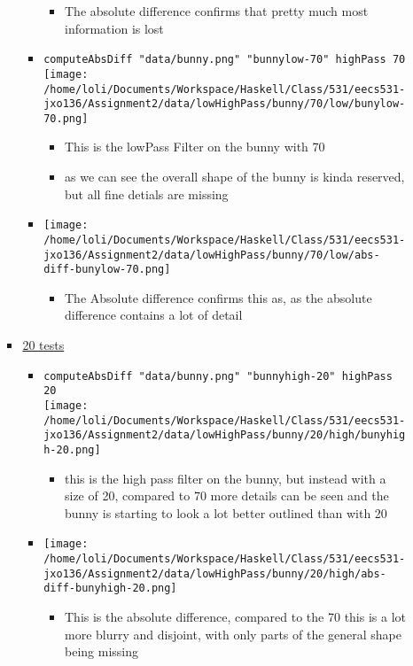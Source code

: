 \documentclass{article}
\begin{document}
\begin{enumerate}
\begin{enumerate}
\begin{itemize}
\begin{itemize}
\begin{itemize}
\item The absolute difference confirms that pretty much most
information is lost
\end{itemize}
\item \texttt{computeAbsDiff "data/bunny.png" "bunnylow-70" highPass 70} \\
    \texttt{[image: /home/loli/Documents/Workspace/Haskell/Class/531/eecs531-jxo136/Assignment2/data/lowHighPass/bunny/70/low/bunylow-70.png]}
\begin{itemize}
\item This is the lowPass Filter on the bunny with 70
\item as we can see the overall shape of the bunny is kinda reserved,
but all fine detials are missing
\end{itemize}
\item \texttt{[image: /home/loli/Documents/Workspace/Haskell/Class/531/eecs531-jxo136/Assignment2/data/lowHighPass/bunny/70/low/abs-diff-bunylow-70.png]}
\begin{itemize}
\item The Absolute difference confirms this as, as the absolute
difference contains a lot of detail
\end{itemize}
\end{itemize}
\item \uline{20 tests}
\begin{itemize}
\item \texttt{computeAbsDiff "data/bunny.png" "bunnyhigh-20" highPass 20} \\
    \texttt{[image: /home/loli/Documents/Workspace/Haskell/Class/531/eecs531-jxo136/Assignment2/data/lowHighPass/bunny/20/high/bunyhigh-20.png]}
\begin{itemize}
\item this is the high pass filter on the bunny, but instead with a
size of 20, compared to 70 more details can be seen and the bunny
is starting to look a lot better outlined than with 20
\end{itemize}
\item \texttt{[image: /home/loli/Documents/Workspace/Haskell/Class/531/eecs531-jxo136/Assignment2/data/lowHighPass/bunny/20/high/abs-diff-bunyhigh-20.png]}
\begin{itemize}
\item This is the absolute difference, compared to the 70 this is a
lot more blurry and disjoint, with only parts of the general shape
being missing

\end{itemize}
\end{itemize}
\end{itemize}
\end{enumerate}
\end{enumerate}
\end{document}
